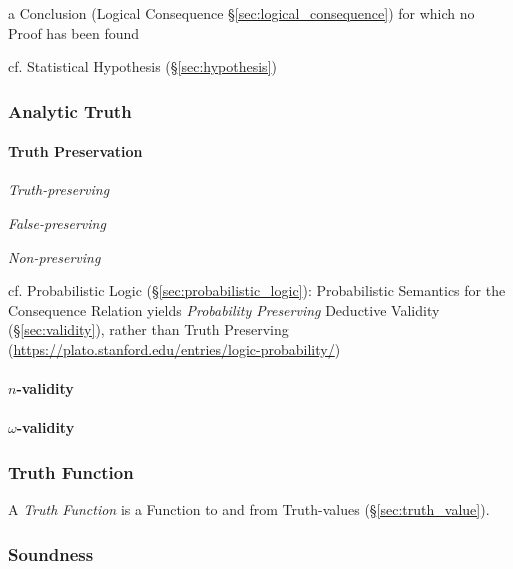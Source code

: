 a Conclusion (Logical Consequence \S\ref{sec:logical_consequence}) for which no
Proof has been found


cf. Statistical Hypothesis (\S\ref{sec:hypothesis})



\subsubsection{Analytic Truth}\label{sec:analytic_truth}

\paragraph{Truth Preservation}\label{sec:truth_preservation}\hfill

\emph{Truth-preserving}

\emph{False-preserving}

\emph{Non-preserving}

cf. Probabilistic Logic (\S\ref{sec:probabilistic_logic}): Probabilistic
Semantics for the Consequence Relation yields \emph{Probability Preserving}
Deductive Validity (\S\ref{sec:validity}), rather than Truth Preserving
(\url{https://plato.stanford.edu/entries/logic-probability/})



\paragraph{$n$-validity}\label{sec:n_validity}\hfill

\paragraph{$\omega$-validity}\label{sec:omega_validity}\hfill



\subsubsection{Truth Function}\label{sec:truth_function}

A \emph{Truth Function} is a Function to and from Truth-values
(\S\ref{sec:truth_value}).



\subsubsection{Soundness}\label{sec:soundness}

